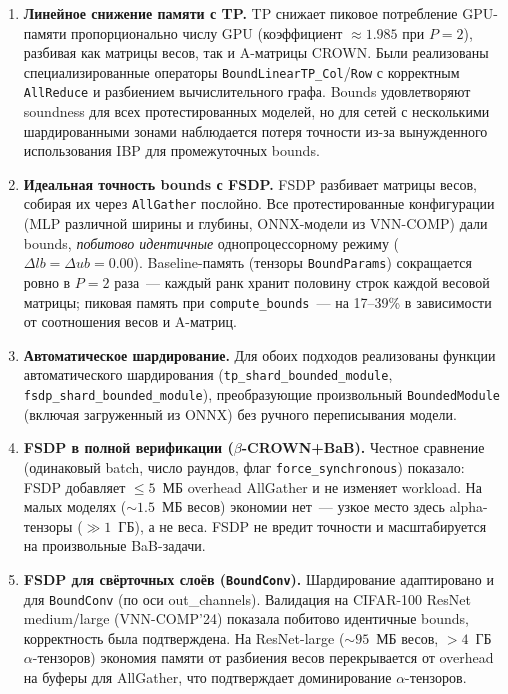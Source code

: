 \begin{enumerate}
    \item \textbf{Линейное снижение памяти с TP.}
    TP снижает пиковое потребление GPU-памяти пропорционально
    числу GPU (коэффициент $\approx 1.985$ при $P = 2$),
    разбивая как матрицы весов, так и A-матрицы CROWN.
    Были реализованы специализированные операторы
    \texttt{BoundLinearTP\_Col}/\texttt{Row} с корректным
    \texttt{AllReduce} и разбиением вычислительного графа.
    Bounds удовлетворяют soundness для всех протестированных моделей,
    но для сетей с несколькими шардированными зонами
    наблюдается потеря точности из-за вынужденного
    использования IBP для промежуточных bounds.

    \item \textbf{Идеальная точность bounds с FSDP.}
    FSDP разбивает матрицы весов, собирая их через \texttt{AllGather} послойно.
    Все протестированные конфигурации (MLP различной
    ширины и глубины, ONNX-модели из VNN-COMP) дали
    bounds, \textit{побитово идентичные} однопроцессорному
    режиму ($\Delta lb = \Delta ub = 0.00$). Baseline-память
    (тензоры \texttt{BoundParams}) сокращается ровно в $P{=}2$
    раза~--- каждый ранк хранит половину строк каждой весовой
    матрицы; пиковая память при \texttt{compute\_bounds}~---
    на 17--39\% в зависимости от соотношения весов и A-матриц.

    \item \textbf{Автоматическое шардирование.}
    Для обоих подходов реализованы функции автоматического
    шардирования (\texttt{tp\_shard\_bounded\_module},
    \texttt{fsdp\_shard\_bounded\_module}), преобразующие
    произвольный \texttt{BoundedModule} (включая загруженный
    из ONNX) без ручного переписывания модели.

    \item \textbf{FSDP в полной верификации ($\beta$-CROWN+BaB).}
    Честное сравнение (одинаковый batch, число раундов,
    флаг \texttt{force\_synchronous}) показало: FSDP
    добавляет $\le\!5$~МБ overhead AllGather и не изменяет
    workload. На малых моделях ($\sim\!1.5$~МБ весов)
    экономии нет~--- узкое место здесь alpha-тензоры
    ($\gg 1$~ГБ), а не веса. FSDP не вредит точности
    и масштабируется на произвольные BaB-задачи.

    \item \textbf{FSDP для свёрточных слоёв (\texttt{BoundConv}).}
    Шардирование адаптировано и для \texttt{BoundConv}
    (по оси out\_channels). Валидация на CIFAR-100 ResNet
    medium/large (VNN-COMP'24) показала побитово идентичные bounds,
    корректность была подтверждена. На ResNet-large ($\sim\!95$~МБ
    весов, $>4$~ГБ $\alpha$-тензоров) экономия памяти
    от разбиения весов перекрывается от overhead на буферы для AllGather,
    что подтверждает доминирование $\alpha$-тензоров.


\end{enumerate}
